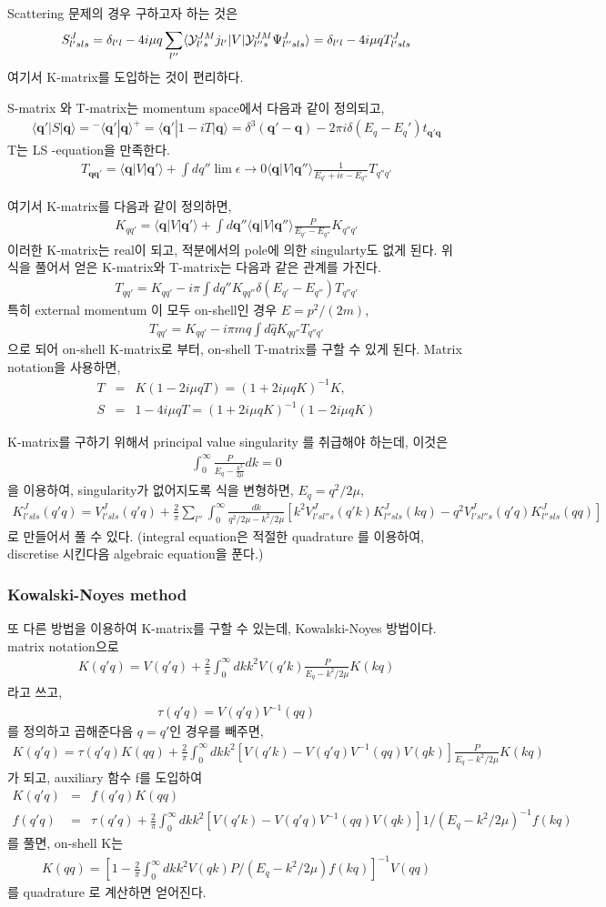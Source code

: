 \documentclass[10pt]{book}
\def\bm{\boldsymbol}
\newcommand{\bea}{\begin{eqnarray}}
\newcommand{\eea}{\end{eqnarray}}
\newcommand{\no}{\nonumber \\}
\def\vq{{\bm q}}
\def\la{\langle}
\def\ra{\rangle}
\begin{document}
Scattering 문제의 경우 구하고자 하는 것은 
\bea
S^J_{l' s ls}=\delta_{l'l}-4i\mu q\sum_{l''}
      \la {\cal Y}^{JM}_{l's} j_{l'}|V|{\cal Y}^{JM}_{l''s} \Psi^J_{l''s ls}\ra
  =\delta_{l'l}-4i\mu q T^{J}_{l's ls}
\eea
여기서 K-matrix를 도입하는 것이 편리하다. 

S-matrix 와 T-matrix는 momentum space에서 다음과 같이 정의되고,
\bea
\la \vq'|S|\vq\ra
={}^-\la \vq'|\vq\ra^{+}=\la \vq'|1- i T |\vq\ra
=\delta^{3}(\vq'-\vq)-2\pi i\delta(E_q-E_q') t_{\vq'\vq} 
\eea
T는 LS -equation을 만족한다.
\bea
T_{\vq\vq'}=\la \vq|V|\vq'\ra
                    +\int dq'' \lim{\epsilon\to 0}
                      \la \vq|V|\vq''\ra \frac{1}{E_{q'}+i\epsilon-E_{q''}}T_{q'' q'}
\eea

여기서 K-matrix를 다음과 같이 정의하면,
\bea
K_{qq'}= \la \vq|V|\vq'\ra+\int d\vq''\la \vq|V|\vq''\ra
                           \frac{P}{E_{q'}-E_{q''}}K_{q'' q'}
\eea
이러한 K-matrix는 real이 되고, 적분에서의 pole에 의한 singularty도 없게 된다.
위 식을 풀어서 얻은 K-matrix와 T-matrix는  다음과 같은 관계를 가진다.
\bea
T_{q q'}=K_{qq'}-i\pi\int dq'' K_{q q''}\delta(E_{q'}-E_{q''})T_{q'' q'}
\eea 
특히 external momentum 이 모두 on-shell인 경우 $E=p^2/(2m)$,
\bea
T_{qq'}=K_{qq'}-i\pi m q\int d\hat{q} K_{qq''}T_{q'' q'}
\eea
으로 되어 on-shell K-matrix로 부터, on-shell T-matrix를 구할 수 있게 된다. 
Matrix notation을 사용하면,
\bea
T&=&K(1-2i\mu q T)=(1+2i\mu q K)^{-1} K,\no 
S&=&1-4i\mu q T=(1+2i\mu q K)^{-1}(1-2i\mu q K)
\eea

K-matrix를 구하기 위해서 principal value singularity 를 취급해야 하는데,
이것은 
\bea
\int_0^\infty \frac{P}{E_q-\frac{k^2}{2\mu}}d k=0
\eea
을 이용하여, singularity가 없어지도록 식을 변형하면, $E_q=q^2/2\mu$,
\bea
K^J_{l's ls}(q'q)=V^J_{l's ls}(q'q)+\frac{2}{\pi}\sum_{l''}\int_0^\infty 
              \frac{dk}{q^2/2\mu-k^2/2\mu}
          [k^2 V^J_{l' s l'' s}(q' k) K^J_{l'' s ls}(k q)
          -q^2 V^J_{l's l'' s}(q' q) K^J_{l'' s ls}(qq)]
\eea
로 만들어서 풀 수 있다. (integral equation은 적절한 quadrature 를 
이용하여, discretise 시킨다음 algebraic equation을 푼다.)

\subsubsection{Kowalski-Noyes method }
또 다른 방법을 이용하여 K-matrix를 구할 수 있는데, Kowalski-Noyes 방법이다.
matrix notation으로
\bea
K(q' q)=V(q'q)+\frac{2}{\pi}\int_0^\infty dk k^2 V(q' k)\frac{P}{E_q-k^2/2\mu}K(kq)
\eea
라고 쓰고, 
\bea
\tau(q'q)=V(q'q)V^{-1}(qq)
\eea
를 정의하고 곱해준다음 $q=q'$인 경우를 빼주면, 
\bea
K(q'q)=\tau(q'q)K(qq)+\frac{2}{\pi}\int_0^\infty dk k^2
       [V(q' k)-V(q'q)V^{-1}(qq)V(qk)]\frac{P}{E_q-k^2/2\mu}K(kq)
\eea 
가 되고, auxiliary 함수 f를 도입하여
\bea
K(q'q)&=&f(q'q)K(qq) \no
f(q'q)&=&\tau(q'q)+\frac{2}{\pi}\int_0^\infty dk k^2[V(q' k)-V(q'q) V^{-1}(qq)V(qk)]
              1/(E_q-k^2/2\mu)^{-1} f(kq)
\eea 
를 풀면, on-shell K는 
\bea
K(qq)=[1-\frac{2}{\pi}\int_0^\infty dk k^2 V(qk) P/(E_q-k^2/2\mu) f(kq)]^{-1} V(qq)
\eea
를 quadrature 로 계산하면 얻어진다.
\end{document}
